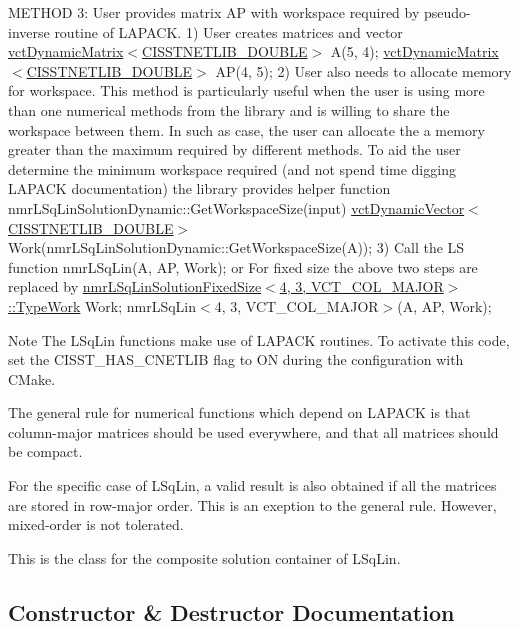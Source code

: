 M\+E\+T\+H\+O\+D 3\+: User provides matrix A\+P with workspace required by pseudo-\/inverse routine of L\+A\+P\+A\+C\+K. 1) User creates matrices and vector \hyperlink{classvct_dynamic_matrix}{vct\+Dynamic\+Matrix$<$\+C\+I\+S\+S\+T\+N\+E\+T\+L\+I\+B\+\_\+\+D\+O\+U\+B\+L\+E$>$} A(5, 4); \hyperlink{classvct_dynamic_matrix}{vct\+Dynamic\+Matrix$<$\+C\+I\+S\+S\+T\+N\+E\+T\+L\+I\+B\+\_\+\+D\+O\+U\+B\+L\+E$>$} A\+P(4, 5); 2) User also needs to allocate memory for workspace. This method is particularly useful when the user is using more than one numerical methods from the library and is willing to share the workspace between them. In such as case, the user can allocate the a memory greater than the maximum required by different methods. To aid the user determine the minimum workspace required (and not spend time digging L\+A\+P\+A\+C\+K documentation) the library provides helper function nmr\+L\+Sq\+Lin\+Solution\+Dynamic\+::\+Get\+Workspace\+Size(input) \hyperlink{classvct_dynamic_vector}{vct\+Dynamic\+Vector$<$\+C\+I\+S\+S\+T\+N\+E\+T\+L\+I\+B\+\_\+\+D\+O\+U\+B\+L\+E$>$} Work(nmr\+L\+Sq\+Lin\+Solution\+Dynamic\+::\+Get\+Workspace\+Size(\+A)); 3) Call the L\+S function nmr\+L\+Sq\+Lin(\+A, A\+P, Work); or For fixed size the above two steps are replaced by \hyperlink{classnmr_l_sq_lin_solution_fixed_size_a2804f3b3815a82a0f9655bcd2f86e7e4}{nmr\+L\+Sq\+Lin\+Solution\+Fixed\+Size$<$4, 3, V\+C\+T\+\_\+\+C\+O\+L\+\_\+\+M\+A\+J\+O\+R$>$\+::\+Type\+Work} Work; nmr\+L\+Sq\+Lin$<$4, 3, V\+C\+T\+\_\+\+C\+O\+L\+\_\+\+M\+A\+J\+O\+R$>$(\+A, A\+P, Work);

\begin{DoxyNote}{Note}
The L\+Sq\+Lin functions make use of L\+A\+P\+A\+C\+K routines. To activate this code, set the C\+I\+S\+S\+T\+\_\+\+H\+A\+S\+\_\+\+C\+N\+E\+T\+L\+I\+B flag to O\+N during the configuration with C\+Make. 

The general rule for numerical functions which depend on L\+A\+P\+A\+C\+K is that column-\/major matrices should be used everywhere, and that all matrices should be compact. 

For the specific case of L\+Sq\+Lin, a valid result is also obtained if all the matrices are stored in row-\/major order. This is an exeption to the general rule. However, mixed-\/order is not tolerated.
\end{DoxyNote}
This is the class for the composite solution container of L\+Sq\+Lin. 

\subsection{Constructor \& Destructor Documentation}
\hypertarget{classnmr_l_sq_lin_solution_dynamic_ae6a2c99c6f99fb37fcab94484dc319f7}{}
